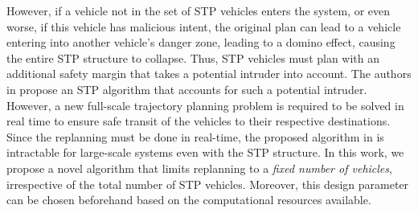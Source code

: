 However, if a vehicle not in the set of STP vehicles enters the system, or even worse, if this vehicle has malicious intent, the original plan can lead to a vehicle entering into another vehicle's danger zone, leading to a domino effect, causing the entire STP structure to collapse. Thus, STP vehicles must plan with an additional safety margin that takes a potential intruder into account. The authors in \cite{chen2016robust} propose an STP algorithm that accounts for such a potential intruder. However, a new full-scale trajectory planning problem is required to be solved in real time to ensure safe transit of the vehicles to their respective destinations. Since the replanning must be done in real-time, the proposed algorithm in \cite{chen2016robust} is intractable for large-scale systems even with the STP structure. In this work, we propose a novel algorithm that limits replanning to a \textit{fixed number of vehicles}, irrespective of the total number of STP vehicles. Moreover, this design parameter can be chosen beforehand based on the computational resources available. 

